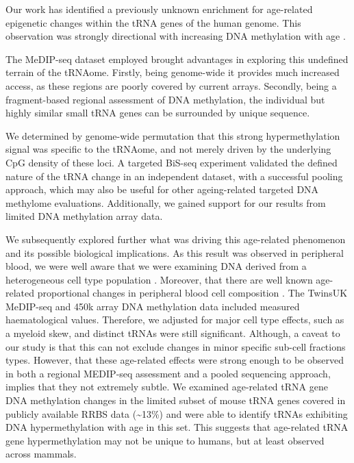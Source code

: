 \documentclass[]{book}
\begin{document}
Our work has identified a previously unknown enrichment for age-related epigenetic changes within the tRNA genes of the human genome.
This observation was strongly directional with increasing DNA methylation with age \citep{Ehrlich2019}.

The MeDIP-seq dataset employed brought advantages in exploring this undefined terrain of the tRNAome.
Firstly, being genome-wide it provides much increased access, as these regions are poorly covered by current arrays.
Secondly, being a fragment-based regional assessment of DNA methylation, the individual but highly similar small tRNA genes can be surrounded by unique sequence.

We determined by genome-wide permutation that this strong hypermethylation signal was specific to the tRNAome, and not merely driven by the underlying CpG density of these loci.
A targeted BiS-seq experiment validated the defined nature of the tRNA change in an independent dataset, with a successful pooling approach, which may also be useful for other ageing-related targeted DNA methylome evaluations.
Additionally, we gained support for our results from limited DNA methylation array data.

We subsequently explored further what was driving this age-related phenomenon and its possible biological implications.
As this result was observed in peripheral blood, we were well aware that we were examining DNA derived from a heterogeneous cell type population \citep{Lappalainen2017a}.
Moreover, that there are well known age-related proportional changes in peripheral blood cell composition \citep{Geiger2013}.
The TwinsUK MeDIP-seq and 450k array DNA methylation data included measured haematological values.
Therefore, we adjusted for major cell type effects, such as a myeloid skew, and distinct tRNAs were still significant.
Although, a caveat to our study is that this can not exclude changes in minor specific sub-cell fractions types.
However, that these age-related effects were strong enough to be observed in both a regional MEDIP-seq assessment and a pooled sequencing approach, implies that they not extremely subtle.
We examined age-related tRNA gene DNA methylation changes in the limited subset of mouse tRNA genes covered in publicly available RRBS data (\textasciitilde13\%) and were able to identify tRNAs exhibiting DNA hypermethylation with age in this set.
This suggests that age-related tRNA gene hypermethylation may not be unique to humans, but at least observed across mammals.
\end{document}
